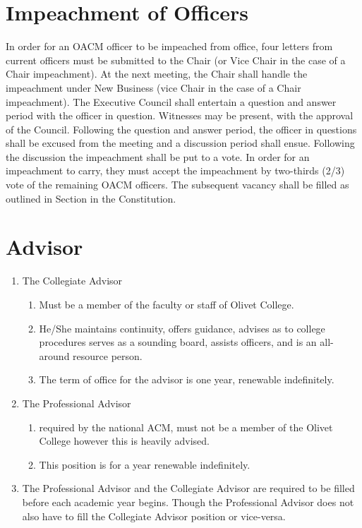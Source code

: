 \documentclass[letterpaper, 12pt]{article}
\begin{document}
\section{Impeachment of Officers}
In order for an OACM officer to be impeached from office, four letters from 
current officers must be submitted to the Chair (or Vice Chair in the case 
of a Chair impeachment).  
At the next meeting, the Chair shall handle the impeachment under New 
Business (vice Chair in the case of a Chair impeachment).  
The Executive Council shall entertain a question and answer period with the 
officer in question.  
Witnesses may be present, with the approval of the Council.  
Following the question and answer period, the officer in questions shall be 
excused from the meeting and a discussion period shall ensue.  
Following the discussion the impeachment shall be put to a vote.  
In order for an impeachment to carry, they must accept the impeachment by 
two-thirds (2/3) vote of the remaining OACM officers.  
The subsequent vacancy shall be filled as outlined in Section in the 
Constitution.
\section{Advisor}
\begin{enumerate}
    \item The Collegiate Advisor 
        \begin{enumerate}
            \item Must be a member of the faculty or staff of Olivet 
                College.
            \item He/She maintains continuity, offers guidance, advises as 
                to college procedures serves as a sounding board, assists 
                officers, and is an all-around resource person.
            \item The term of office for the advisor is one year, renewable 
                indefinitely.
        \end{enumerate}
    \item The Professional Advisor
        \begin{enumerate}
            \item required by the national ACM, must not be a member of the 
                Olivet College however this is heavily advised.
            \item This position is for a year renewable indefinitely.
        \end{enumerate}
    \item The Professional Advisor and the Collegiate Advisor are required 
        to be filled before each academic year begins.
        Though the Professional Advisor does not also have to fill the 
        Collegiate Advisor position or vice-versa.
\end{enumerate}
\end{document}
